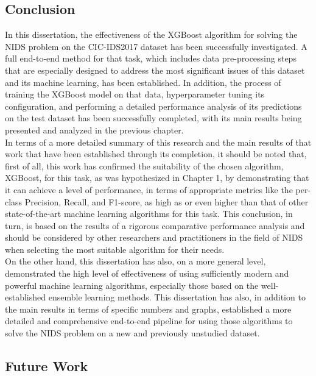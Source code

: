 \subsection{Conclusion} 

In this dissertation, the effectiveness of the XGBoost algorithm for solving the NIDS problem on the CIC-IDS2017 dataset has been successfully investigated. A full end-to-end method for that task, which includes data pre-processing steps that are especially designed to address the most significant issues of this dataset and its machine learning, has been established. In addition, the process of training the XGBoost model on that data, hyperparameter tuning its configuration, and performing a detailed performance analysis of its predictions on the test dataset has been successfully completed, with its main results being presented and analyzed in the previous chapter.\\

In terms of a more detailed summary of this research and the main results of that work that have been established through its completion, it should be noted that, first of all, this work has confirmed the suitability of the chosen algorithm, XGBoost, for this task, as was hypothesized in Chapter 1, by demonstrating that it can achieve a level of performance, in terms of appropriate metrics like the per-class Precision, Recall, and F1-score, as high as or even higher than that of other state-of-the-art machine learning algorithms for this task. This conclusion, in turn, is based on the results of a rigorous comparative performance analysis and should be considered by other researchers and practitioners in the field of NIDS when selecting the most suitable algorithm for their needs.\\

On the other hand, this dissertation has also, on a more general level, demonstrated the high level of effectiveness of using sufficiently modern and powerful machine learning algorithms, especially those based on the well-established ensemble learning methods. This dissertation has also, in addition to the main results in terms of specific numbers and graphs, established a more detailed and comprehensive end-to-end pipeline for using those algorithms to solve the NIDS problem on a new and previously unstudied dataset.

\subsection{Future Work} 

